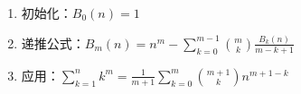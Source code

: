 \begin{enumerate}
	\item 初始化：$B_0(n) = 1$
	\item 递推公式：$\displaystyle B_m(n) = n^m - \sum_{k = 0}^{m - 1}\binom{m}{k} \frac{B_k(n)}{m - k + 1}$
	\item 应用：$\displaystyle \sum_{k = 1}^{n} k^m = \frac{1}{m + 1}\sum_{k = 0}^{m}\binom{m + 1}{k}n^{m + 1 - k}$
\end{enumerate}
